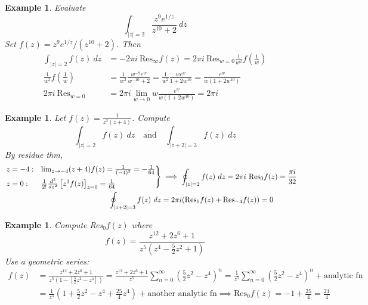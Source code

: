 \documentclass{article}
\newtheorem{example}[theorem]{Example}
\theoremstyle{definition}
\begin{document}
\begin{example} \normalfont
    Evaluate
    \begin{equation*}
        \int_{|z|=2} \frac{z^9 e^{1/z}}{z^{10}+2}\ dz
    \end{equation*}
    Set $f(z) = z^9 e^{1/z} / (z^{10}+2)$. Then
    \begin{align*}
        \int_{|z|=2} f(z)\ dz &= - 2\pi i\ \text{Res}_\infty f(z) = 2 \pi i\ \text{Res}_{w=0} \frac{1}{w^2} f\left( \frac{1}{w} \right) \\
        \frac{1}{w^2} f \left(\frac{1}{w}\right) &= \frac{1}{w^2} \frac{w^{-9}e^w}{w^{-10} + 2} = \frac{1}{w^2} \frac{we^w}{1+2w^{10}} = \frac{e^w}{w(1+2w^{10})} \\
        2\pi i\ \text{Res}_{w=0} &= 2 \pi i \lim_{w \to 0} w \frac{e^w}{w(1+2w^{10})} = 2 \pi i
    \end{align*}
\end{example}

\begin{example} \normalfont
    Let $f(z) = \frac{1}{z^3(z+4)}$. Compute
    \begin{equation*}
        \int_{|z| = 2} f(z)\ dz \quad \text{and} \quad \int_{|z+2| = 3} f(z)\ dz
    \end{equation*}
    By residue thm, \vspace{-1em}
    \begin{align*}
        \begin{rcases}
            z=-4: & \lim_{z \to -4} (z+4)f(z) = \frac{1}{(-4)^3} = -\frac{1}{64} \\
            z=0: & \frac{1}{2!} \frac{d^2}{dz^2} \left[z^3f(z) \right]_{z=0} = \frac{1}{64}
        \end{rcases} &\implies
        \oint_{|z|=2} f(z)\ dz = 2 \pi i\ \text{Res}_0 f(z) = \frac{\pi i}{32} \\
        \oint_{|z+2| = 3} f(z)\ dz &= 2\pi i (\text{Res}_0 f(z) + \text{Res}_{-4} f(z)) = 0
    \end{align*}
\end{example}

\begin{example} \normalfont
    Compute Res$_0 f(z)$ where
    \begin{equation*}
        f(z) = \frac{z^{12} + 2z^6 + 1}{z^5(z^4 - \frac{5}{2}z^2 + 1)}
    \end{equation*}
    Use a geometric series:
    \begin{align*}
        f(z) &= \frac{z^{12} + 2z^6 + 1}{z^5 \left( 1 - [\frac{5}{2} z^2 - z^4] \right)} = \frac{z^{12} + 2z^6 + 1}{z^5} \sum_{n=0}^\infty \left( \frac{5}{2}z^2 - z^4 \right)^n = \frac{1}{z^5} \sum_{n=0}^\infty \left( \frac{5}{2}z^2 - z^4 \right)^n + \text{analytic fn} \\
        &= \frac{1}{z^5} \left(1 + \frac{5}{2}z^2 - z^4 + \frac{25}{4}z^4 \right) + \text{another analytic fn} \implies \text{Res}_0 f(z) = -1 + \frac{25}{4} = \frac{21}{4}
    \end{align*}
\end{example}
\end{document}

